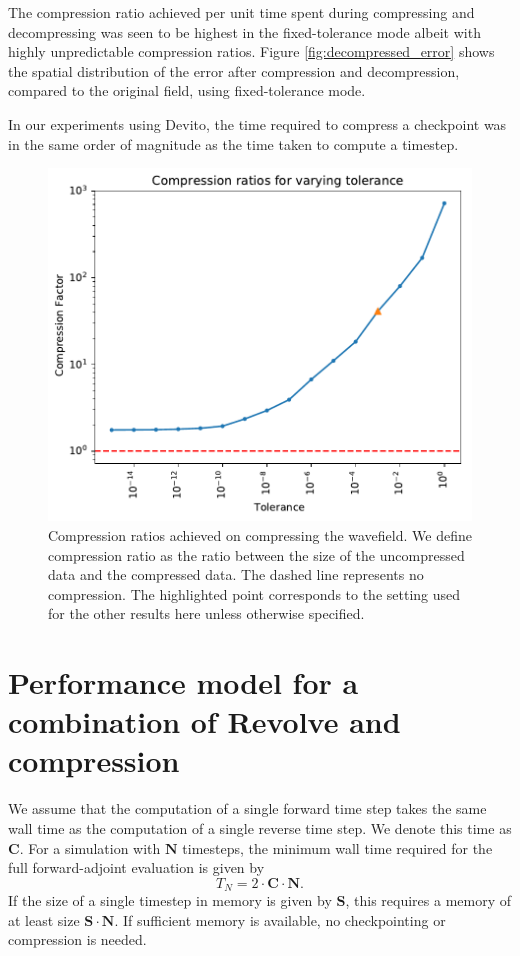 \documentclass[conference]{IEEEtran}
\begin{document}
The compression ratio achieved per unit time spent during compressing
and decompressing was seen to be highest in the fixed-tolerance mode
albeit with highly unpredictable compression ratios. Figure
\ref{fig:decompressed_error} shows the spatial distribution of the
error after compression and decompression, compared to the original
field, using fixed-tolerance mode.

In our experiments using Devito, the time required to compress a checkpoint was
in the same order of magnitude as the time taken to compute a timestep.

\begin{figure}
\begin{center}
\includegraphics[width=0.9\linewidth]{images/tolerance-cf-richter.pdf}
\end{center}
\caption{Compression ratios achieved on compressing the wavefield. We
  define compression ratio as the ratio between the size of the
  uncompressed data and the compressed data. The dashed line
  represents no compression. The highlighted point corresponds to the
  setting used for the other results here unless otherwise specified.}
\label{fig:tolerance_cf_plot}
\end{figure}

\section{Performance model for a combination of Revolve and compression}
\label{sec:performance_model}
We assume that the computation of a single forward time step takes the same wall
time as the computation of a single reverse time step. We denote this time as
$\mathbf{C}$. For a simulation with $\mathbf{N}$ timesteps, the minimum wall time required
for the full forward-adjoint evaluation is given by
\begin{equation}
T_N = 2 \cdot \mathbf{C} \cdot \mathbf{N}.
\end{equation}
If the size of a single timestep in memory is given by $\mathbf{S}$, this
requires a memory of at least size $\mathbf{S} \cdot \mathbf{N}$. If sufficient memory
is available, no checkpointing or compression is needed.
\end{document}
